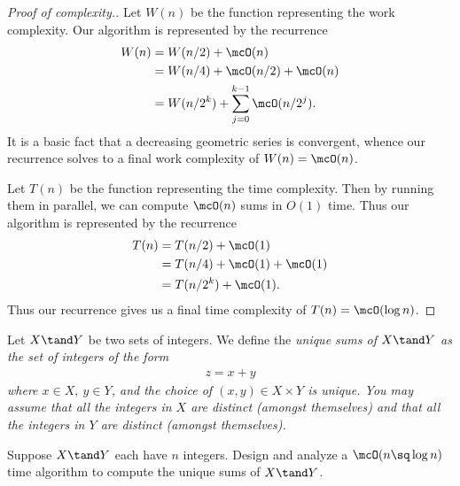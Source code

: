\documentclass[10pt]{article}
\begin{document}
\begin{proof}[Proof of complexity.]
  Let \( W(n) \) be the function representing the work complexity.
  Our algorithm is represented by the recurrence \begin{align*}
    W(n) &= W(n/2) + \mcO(n) \\
         &= W(n/4) + \mcO(n/2) + \mcO(n) \\
         &= W(n/2^k) + \sum_{j=0}^{k-1} \mcO(n/2^j).
  \end{align*}
  It is a basic fact that a decreasing geometric series is convergent, whence our recurrence solves to a final work complexity of \( W(n) = \mcO(n) \).

  Let \( T(n) \) be the function representing the time complexity. Then by running them in parallel, we can compute \( \mcO(n) \) sums in \( O(1) \) time. Thus our algorithm is represented by the recurrence \begin{align*}
    T(n) &= T(n/2) + \mcO(1) \\
         &= T(n/4) + \mcO(1) + \mcO(1) \\
         &= T(n/2^k) + \mcO(1).
  \end{align*}
  Thus our recurrence gives us a final time complexity of \( T(n) = \mcO(\log n) \).
\end{proof}

\pagebreak
\setcounter{section}{4}
\setcounter{exercise}{2}
Let \( X \tand Y \) be two sets of integers. We define the \it{unique sums} of \( X \tand Y \) as the set of integers of the form \begin{align*}
  z = x+y
\end{align*} where \( x\in X,\ y\in Y \), and the choice of \( (x,y) \in X\times Y \) is unique. You may assume that all the integers in \( X \) are distinct (amongst themselves) and that all the integers in \( Y \) are distinct (amongst themselves).

\begin{subexercise}
  Suppose \( X\tand Y \) each have \( n \) integers. Design and analyze a \( \mcO(n\sq \log n) \) time algorithm to compute the unique sums of \( X\tand Y \).
\end{subexercise}
\end{document}
